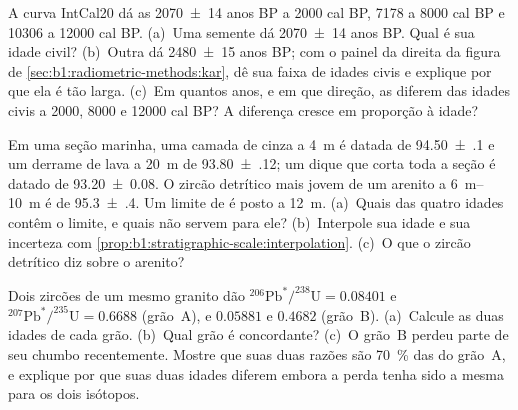 \begin{exercise}[$\star\star$]\label{exo:b1:radiometric-methods:7}
A curva IntCal20 dá as  \num[uncertainty-mode=separate]{2070 \pm 14} anos BP a
\num{2000} cal BP, \num{7178} a \num{8000} cal BP e \num{10306} a \num{12000} cal BP.
(a)~Uma semente dá \num[uncertainty-mode=separate]{2070 \pm 14} anos BP. Qual é sua idade
civil? (b)~Outra dá \num[uncertainty-mode=separate]{2480 \pm 15} anos BP; com o painel da
direita da figura de \cref{sec:b1:radiometric-methods:kar}, dê sua faixa de idades civis e
explique por que ela é tão larga. (c)~Em quantos anos, e em que direção, as 
diferem das idades civis a \num{2000}, \num{8000} e \num{12000} cal BP? A diferença cresce em
proporção à idade?
\end{exercise}

\begin{exercise}[$\star\star$]\label{exo:b1:radiometric-methods:8}
Em uma seção marinha, uma camada de cinza a \qty{4}{m} é datada de
\qty[uncertainty-mode=separate]{94.50(10)}{\Ma} e um derrame de lava a \qty{20}{m} de
\qty[uncertainty-mode=separate]{93.80(12)}{\Ma}; um dique que corta toda a seção é datado de
\qty[uncertainty-mode=separate]{93.20(8)}{\Ma}. O zircão detrítico mais jovem de um arenito a
\qtyrange{6}{10}{m} é de \qty[uncertainty-mode=separate]{95.3(4)}{\Ma}. Um limite de  é
posto a \qty{12}{m}. (a)~Quais das quatro idades contêm o limite, e quais não servem para ele?
(b)~Interpole sua idade e sua incerteza com
\cref{prop:b1:stratigraphic-scale:interpolation}. (c)~O que o zircão detrítico diz sobre o
arenito?
\end{exercise}

\begin{exercise}[$\star\star$]\label{exo:b1:radiometric-methods:9}
Dois zircões de um mesmo granito dão
$^{206}\mathrm{Pb}^*/^{238}\mathrm{U} = 0.08401$ e
$^{207}\mathrm{Pb}^*/^{235}\mathrm{U} = 0.6688$ (grão~A), e $0.05881$ e
$0.4682$ (grão~B). (a)~Calcule as duas idades de cada grão. (b)~Qual grão é concordante?
(c)~O grão~B perdeu parte de seu chumbo recentemente. Mostre que suas duas razões são
\qty{70}{\percent} das do grão~A, e explique por que suas duas idades diferem embora a perda
tenha sido a mesma para os dois isótopos.
\end{exercise}

